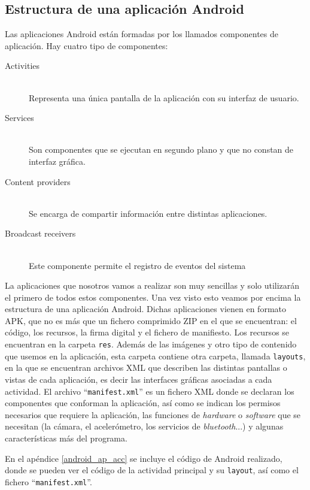 \documentclass[a4paper,openright, 12pt]{book}
\begin{document}
\subsection*{Estructura de una aplicación Android}
Las aplicaciones Android están formadas por los llamados componentes de aplicación. Hay cuatro tipo de componentes:
\begin{description}
  \item[Activities] \hfill \\
  Representa una única pantalla de la aplicación con su interfaz de usuario.
  \item[Services] \hfill \\
  Son componentes que se ejecutan en segundo plano y que no constan de interfaz gráfica.
  \item[Content providers] \hfill \\
  Se encarga de compartir información entre distintas aplicaciones.
  \item[Broadcast receivers] \hfill \\
  Este componente permite el registro de eventos del sistema
\end{description}
La aplicaciones que nosotros vamos a realizar son muy sencillas y solo utilizarán el primero de todos estos componentes.
Una vez visto esto veamos por encima la estructura de una aplicación Android.
Dichas aplicaciones vienen en formato APK, que no es más que un fichero comprimido ZIP en el que se encuentran: el código, los recursos, la firma digital y el fichero de manifiesto.
\newline
Los recursos se encuentran en la carpeta \lstinline|res|. Además de las imágenes y otro tipo de contenido que usemos en la aplicación, esta carpeta contiene otra carpeta, llamada \lstinline|layouts|, en la que se encuentran archivos XML que describen las distintas pantallas o vistas de cada aplicación, es decir las interfaces gráficas asociadas a cada actividad.
\newline
El archivo ``\lstinline|manifest.xml|'' es un fichero XML donde se declaran los componentes que conforman la aplicación, así como se indican los permisos necesarios que requiere la aplicación, las funciones de \textit{hardware} o \textit{software} que se necesitan (la cámara, el acelerómetro, los servicios de \textit{bluetooth}...) y algunas características más del programa.

En el apéndice \ref{android_ap_acc} se incluye el código de Android realizado, donde se pueden ver el código de la actividad principal y su \lstinline|layout|, así como el fichero ``\lstinline|manifest.xml|''.
\end{document}
